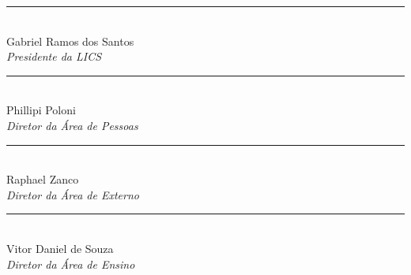 \documentclass[12pt, a4paper]{article}
\begin{document}
\begin{center}

    \begin{minipage}{0.45\textwidth}
        \centering
        \rule{6cm}{0.4pt} \\
        Gabriel Ramos dos Santos \\
        \textit{Presidente da LICS}
    \end{minipage}
    \hspace{0.05\textwidth}
    \begin{minipage}{0.45\textwidth}
        \centering
        \rule{6cm}{0.4pt} \\
        Phillipi Poloni \\
        \textit{Diretor da Área de Pessoas}
    \end{minipage}

    \vspace{2cm}

    \begin{minipage}{0.45\textwidth}
        \centering
        \rule{6cm}{0.4pt} \\
        Raphael Zanco \\
        \textit{Diretor da Área de Externo}
    \end{minipage}
    \hspace{0.05\textwidth}
    \begin{minipage}{0.45\textwidth}
        \centering
        \rule{6cm}{0.4pt} \\
        Vitor Daniel de Souza \\
        \textit{Diretor da Área de Ensino}
    \end{minipage}

\end{center}
\end{document}
